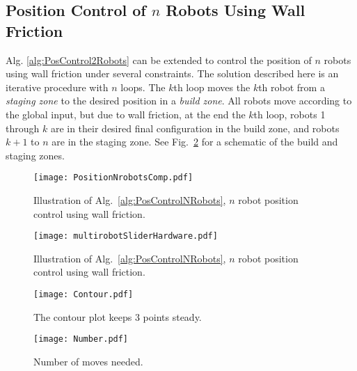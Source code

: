 \subsection{Position Control of $n$ Robots Using Wall Friction}\label{sec:PostionControlnRobots}
Alg. \ref{alg:PosControl2Robots}  can be extended to control the position of $n$ robots using wall friction under several constraints. The solution described here is an iterative procedure with $n$ loops. The $k$th loop moves the $k$th robot from a \emph{staging zone} to the desired position in a \emph{build zone}. All robots move according to the global input, but due to wall friction, at the end the $k$th loop, robots 1 through $k$ are in their desired final configuration in the build zone, and robots $k+1$ to $n$ are in the staging zone. See Fig.~\ref{fig:construction2d} for a schematic of the build and staging zones.
\begin{figure}
\begin{center}
	\texttt{[image: PositionNrobotsComp.pdf]}
\end{center}
\vspace{-1em}
\caption{\label{fig:simulationNrobot}
Illustration of Alg.\ \ref{alg:PosControlNRobots}, $n$ robot position control  using wall friction.
}
\end{figure}

\begin{figure}
\begin{center}
	\texttt{[image: multirobotSliderHardware.pdf]}
\end{center}
\vspace{-1em}
\caption{\label{fig:construction2d}
Illustration of Alg.\ \ref{alg:PosControlNRobots}, $n$ robot position control  using wall friction.
}
\end{figure}

\begin{figure}
\begin{center}
	\texttt{[image: Contour.pdf]}
\end{center}
\vspace{-1em}
\caption{\label{fig:contour}
The contour plot keeps 3 points steady.
}
\end{figure}

\begin{figure}
\begin{center}
	\texttt{[image: Number.pdf]}
\end{center}
\vspace{-1em}
\caption{\label{fig:numberPlot}
Number of moves needed.
}
\end{figure}

